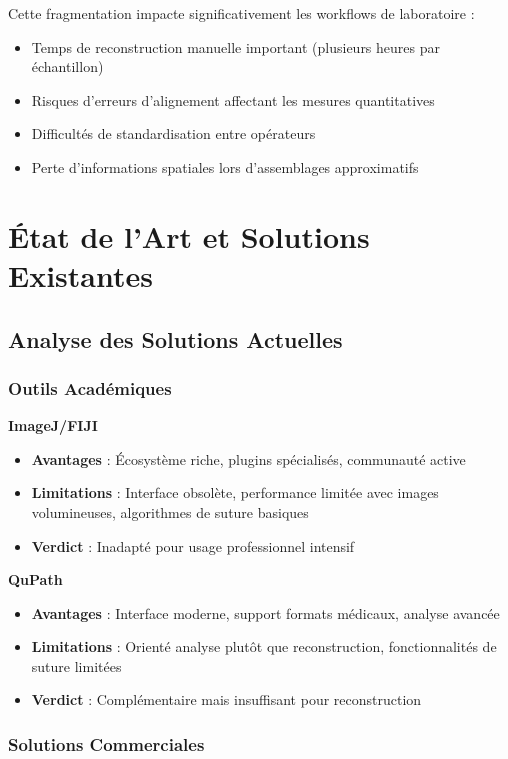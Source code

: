 \documentclass[12pt,a4paper]{report}
\begin{document}
Cette fragmentation impacte significativement les workflows de laboratoire :
\begin{itemize}
\item Temps de reconstruction manuelle important (plusieurs heures par échantillon)
\item Risques d'erreurs d'alignement affectant les mesures quantitatives
\item Difficultés de standardisation entre opérateurs
\item Perte d'informations spatiales lors d'assemblages approximatifs
\end{itemize}

\section{État de l'Art et Solutions Existantes}

\subsection{Analyse des Solutions Actuelles}

\subsubsection{Outils Académiques}

\textbf{ImageJ/FIJI}
\begin{itemize}
\item \textbf{Avantages} : Écosystème riche, plugins spécialisés, communauté active
\item \textbf{Limitations} : Interface obsolète, performance limitée avec images volumineuses, algorithmes de suture basiques
\item \textbf{Verdict} : Inadapté pour usage professionnel intensif
\end{itemize}

\textbf{QuPath}
\begin{itemize}
\item \textbf{Avantages} : Interface moderne, support formats médicaux, analyse avancée
\item \textbf{Limitations} : Orienté analyse plutôt que reconstruction, fonctionnalités de suture limitées
\item \textbf{Verdict} : Complémentaire mais insuffisant pour reconstruction
\end{itemize}

\subsubsection{Solutions Commerciales}
\end{document}
